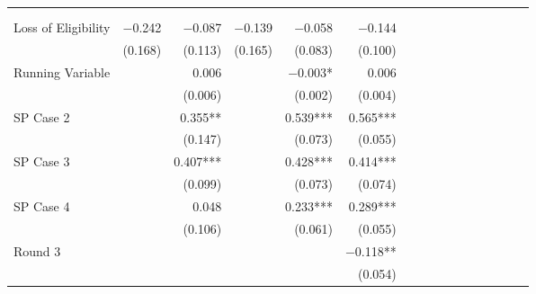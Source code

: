 \begin{tabular}{@{\extracolsep{5pt}}lrrrrrrrrrrrrrrr}
\toprule
& \multicolumn{1}{p{0.13\linewidth}}{\centering{(1)}} & \multicolumn{1}{p{0.13\linewidth}}{\centering{(2)}} & \multicolumn{1}{p{0.13\linewidth}}{\centering{(3)}} & \multicolumn{1}{p{0.13\linewidth}}{\centering{(4)}} & \multicolumn{1}{p{0.13\linewidth}}{\centering{(5)}} \\
& \multicolumn{1}{p{0.13\linewidth}}{\centering{Local Robust}} & \multicolumn{1}{p{0.13\linewidth}}{\centering{Local Linear}} & \multicolumn{1}{p{0.13\linewidth}}{\centering{Global Robust}} & \multicolumn{1}{p{0.13\linewidth}}{\centering{Global Linear}} & \multicolumn{1}{p{0.13\linewidth}}{\centering{Global Diff$-$Diff}} \\
\hline
Loss of Eligibility & $-$0.242\phantom{\phantom{)}***} & $-$0.087\phantom{\phantom{)}***} & $-$0.139\phantom{\phantom{)}***} & $-$0.058\phantom{\phantom{)}***} & $-$0.144\phantom{\phantom{)}***} \\
& (0.168)\phantom{***} & (0.113)\phantom{***} & (0.165)\phantom{***} & (0.083)\phantom{***} & (0.100)\phantom{***} \\
Running Variable & \phantom{***} & 0.006\phantom{\phantom{)}***} & \phantom{***} & $-$0.003\phantom{)}*\phantom{**} & 0.006\phantom{\phantom{)}***} \\
& \phantom{***} & (0.006)\phantom{***} & \phantom{***} & (0.002)\phantom{***} & (0.004)\phantom{***} \\
SP Case 2 & \phantom{***} & 0.355\phantom{)}**\phantom{*} & \phantom{***} & 0.539\phantom{)}*** & 0.565\phantom{)}*** \\
& \phantom{***} & (0.147)\phantom{***} & \phantom{***} & (0.073)\phantom{***} & (0.055)\phantom{***} \\
SP Case 3 & \phantom{***} & 0.407\phantom{)}*** & \phantom{***} & 0.428\phantom{)}*** & 0.414\phantom{)}*** \\
& \phantom{***} & (0.099)\phantom{***} & \phantom{***} & (0.073)\phantom{***} & (0.074)\phantom{***} \\
SP Case 4 & \phantom{***} & 0.048\phantom{\phantom{)}***} & \phantom{***} & 0.233\phantom{)}*** & 0.289\phantom{)}*** \\
& \phantom{***} & (0.106)\phantom{***} & \phantom{***} & (0.061)\phantom{***} & (0.055)\phantom{***} \\
Round 3 & \phantom{***} & \phantom{***} & \phantom{***} & \phantom{***} & $-$0.118\phantom{)}**\phantom{*} \\
& \phantom{***} & \phantom{***} & \phantom{***} & \phantom{***} & (0.054)\phantom{***} \\

\end{tabular}
